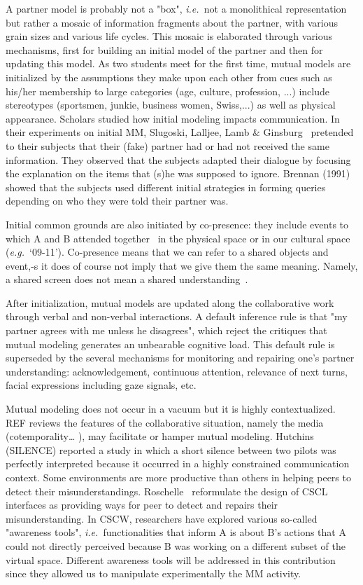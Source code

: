\documentclass{report}
\newcommand{\ie}{{\textit{i.e.\ }}}
\newcommand{\eg}{{\textit{e.g.\ }}}
\begin{document}
A partner model is probably not a "box", \ie not a monolithical representation
but rather a mosaic of information fragments about the partner, with various
grain sizes and various life cycles. This mosaic is elaborated through various
mechanisms, first for building an initial model of the partner and then for
updating this model.  As two students meet for the first time, mutual models are
initialized by the assumptions they make upon each other from cues such as
his/her membership to large categories (age, culture, profession, ...) include
stereotypes (sportsmen, junkie, business women, Swiss,...) as well as physical
appearance. Scholars studied how initial modeling impacts communication. In
their experiments on initial MM, Slugoski, Lalljee, Lamb \&
Ginsburg~\cite{slugoski1993attribution} pretended to their subjects that their
(fake) partner had or had not received the same information. They observed that
the subjects adapted their dialogue by focusing the explanation on the items
that (s)he was supposed to ignore. Brennan (1991) showed that the subjects used
different initial strategies in forming queries depending on who they were told
their partner was.  

Initial common grounds are also initiated by co-presence: they include events to
which A and B attended together~\cite{clark2002definite} in the physical space
or in our cultural space (\eg ‘09-11’). Co-presence means that we can refer to
a shared objects and event,-s it does of course not imply that we give them the
same meaning. Namely, a shared screen does not mean a shared
understanding~\cite{dillenbourg2006sharing}.

After initialization, mutual models are updated along the collaborative work
through verbal and non-verbal interactions. A default inference rule is that "my
partner agrees with me unless he disagrees", which reject the critiques that
mutual modeling generates an unbearable cognitive load. This default rule is
superseded by the several mechanisms for monitoring and repairing one's partner
understanding: acknowledgement, continuous attention, relevance of next turns,
facial expressions including gaze signals, etc.

Mutual modeling does not occur in a vacuum but it is highly contextualized. REF
reviews the features of the collaborative situation, namely the media
(cotemporality… ), may facilitate or hamper mutual modeling. Hutchins (SILENCE)
reported a study in which a short silence between two pilots was perfectly
interpreted because it occurred in a highly constrained communication context.
Some environments are more productive than others in helping peers to detect
their misunderstandings. Roschelle~\cite{roschelle1995construction} reformulate
the design of CSCL interfaces as providing ways for peer to detect and repairs
their misunderstanding. In CSCW, researchers have explored various so-called
"awareness tools", \ie functionalities that inform A is about B's actions that A
could not directly perceived because B was working on a different subset of the
virtual space. Different awareness tools will be addressed in this contribution
since they allowed us to manipulate experimentally the MM activity. 
\end{document}
